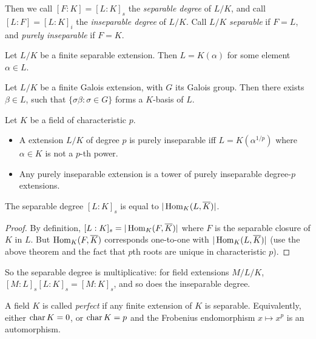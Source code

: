 \documentclass[11pt]{amsart}
\begin{document}
Then we call $[F:K] = [L:K]_s$ the \emph{separable degree} of $L/K$, and call $[L:F] = [L:K]_i$ the \emph{inseparable degree} of $L/K$. Call $L/K$ \emph{separable} if $F = L$, and \emph{purely inseparable} if $F = K$.

\begin{thm}
Let $L/K$ be a finite separable extension. Then $L = K(\alpha)$ for some element $\alpha\in L$.
\end{thm}

\begin{thm}
\label{normal_basis}
    Let $L/K$ be a finite Galois extension, with $G$ its Galois group. Then there exists $\beta\in L$, such that $\{\sigma \beta: \sigma\in G\}$ forms a $K$-basis of $L$.
\end{thm}

\begin{thm}
Let $K$ be a field of characteristic $p$. 
\begin{itemize}
    \item A extension $L/K$ of degree $p$ is purely inseparable iff $L = K(\alpha^{1/p})$ where $\alpha \in K$ is not a $p$-th power.
    \item Any purely inseparable extension is a tower of purely inseparable degree-$p$ extensions.
\end{itemize}
\end{thm}

\begin{prop}
The separable degree $[L:K]_s$ is equal to $|\operatorname{Hom}_K(L, \overline{K})|$.
\end{prop}

\begin{proof}
By definition, $[L:K]_s = |\operatorname{Hom}_K(F, \overline{K})|$ where $F$ is the separable closure of $K$ in $L$. But $\operatorname{Hom}_K(F, \overline{K})$ corresponds one-to-one with $|\operatorname{Hom}_K(L, \overline{K})|$ (use the above theorem and the fact that $p$th roots are unique in characteristic $p$).
\end{proof}

So the separable degree is multiplicative: for field extensions $M/L/K$, $[M:L]_s[L:K]_s = [M:K]_s$, and so does the inseparable degree.

\begin{defn}
A field $K$ is called \emph{perfect} if any finite extension of $K$ is separable. Equivalently, either $\operatorname{char} K = 0$, or $\operatorname{char} K = p$ and the Frobenius endomorphism $x\mapsto x^p$ is an automorphism.
\end{defn}
\end{document}

